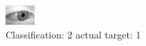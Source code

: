 \begin{figure}[h!]
\begin{center}
\includegraphics[width=0.60\columnwidth]{figures/ID2730_class_2_target_1.png}
\end{center}
\caption{ Classification: 2 actual target: 1}
\label{fig:ID2730_class_2_target_1}
\end{figure}
